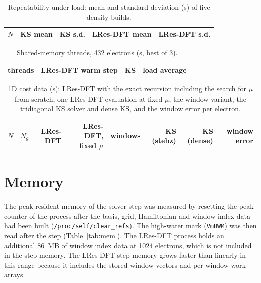 \documentclass[aps,prb,onecolumn,superscriptaddress,floatfix]{revtex4-2}
\begin{document}
\begin{table}[h]
\caption{\label{tab:repeat}Repeatability under load: mean and standard deviation (s) of five density builds.}
\begin{ruledtabular}
\begin{tabular}{rrrrr}
$N$ & KS mean & KS s.d. & LRes-DFT mean & LRes-DFT s.d. \\
\hline

\end{tabular}
\end{ruledtabular}
\end{table}

\begin{table}[h]
\caption{\label{tab:threads}Shared-memory threads, 432 electrons (s, best of 3).}
\begin{ruledtabular}
\begin{tabular}{rrrr}
threads & LRes-DFT warm step & KS & load average \\
\hline

\end{tabular}
\end{ruledtabular}
\end{table}

\begin{table}[h]
\caption{\label{tab:cost1d}1D cost data (s): LRes-DFT with the exact recursion including the search for $\mu$ from scratch,
one LRes-DFT evaluation at fixed $\mu$, the window variant, the tridiagonal KS solver and dense KS, and the window error per
electron.}
\begin{ruledtabular}
\begin{tabular}{rrrrrrrr}
$N$ & $N_g$ & LRes-DFT & LRes-DFT, fixed $\mu$ & windows & KS (stebz) & KS (dense) & window error \\
\hline

\end{tabular}
\end{ruledtabular}
\end{table}

\section{Memory}

The peak resident memory of the solver step was measured by resetting the peak counter of the process after the basis,
grid, Hamiltonian and window index data had been built (\texttt{/proc/self/clear\_refs}). The high-water mark
(\texttt{VmHWM}) was then read after the step (Table~\ref{tab:mem}). The LRes-DFT process holds an additional 86~MB of
window index data at 1024 electrons, which is not included in the step memory. The LRes-DFT step memory grows faster than
linearly in this range because it includes the stored window vectors and per-window work arrays.
\end{document}

